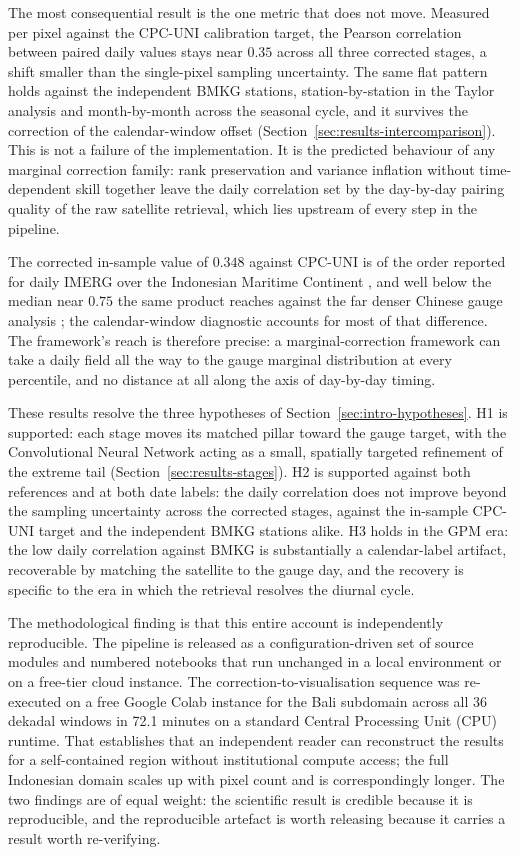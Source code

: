 The most consequential result is the one metric that
does not move. Measured per pixel against the CPC-UNI calibration
target, the Pearson correlation between paired daily values stays
near $0.35$ across all three corrected stages, a shift smaller
than the single-pixel sampling uncertainty. The same flat pattern
holds against the independent BMKG stations, station-by-station in
the Taylor analysis and month-by-month across the seasonal cycle,
and it survives the correction of the calendar-window offset
(Section~\ref{sec:results-intercomparison}). This is not a failure of the implementation. It is the
predicted behaviour of any marginal correction family: rank
preservation and variance inflation without time-dependent skill
together leave the daily correlation set by the day-by-day
pairing quality of the raw satellite retrieval, which lies
upstream of every step in the pipeline.

The corrected
in-sample value of $0.348$ against CPC-UNI is of the order reported
for daily IMERG over the Indonesian Maritime Continent
\citep{ref:ramadhan2022ts}, and well below the median near $0.75$
the same product reaches against the far denser Chinese gauge
analysis \citep{ref:tang2020}; the calendar-window diagnostic
accounts for most of that difference. The framework's reach is
therefore precise: a marginal-correction framework
can take a daily field all the way to the gauge marginal
distribution at every percentile, and no distance at all along
the axis of day-by-day timing.

These results resolve the three hypotheses of
Section~\ref{sec:intro-hypotheses}. H1 is supported: each stage
moves its matched pillar toward the gauge target, with the
Convolutional Neural Network acting as a small, spatially targeted
refinement of the extreme tail
(Section~\ref{sec:results-stages}). H2 is supported against both
references and at both date labels: the daily correlation does not
improve beyond the sampling uncertainty across the corrected
stages, against the in-sample CPC-UNI target and the independent
BMKG stations alike. H3 holds in the GPM era: the low daily
correlation against BMKG is substantially a calendar-label
artifact, recoverable by matching the satellite to the gauge day,
and the recovery is specific to the era in which the retrieval
resolves the diurnal cycle.

The methodological finding is that this entire account is
independently reproducible. The pipeline is released as a
configuration-driven set of source modules and numbered
notebooks that run unchanged in a local environment or on a
free-tier cloud instance. The correction-to-visualisation sequence
was re-executed
on a free Google Colab instance for the Bali subdomain across all
36 dekadal windows in 72.1 minutes on a standard Central
Processing Unit (CPU) runtime. That establishes that an independent
reader can reconstruct the results for a self-contained region
without institutional compute access; the full Indonesian domain
scales up with pixel count and is correspondingly longer. The two findings are of equal
weight: the scientific result is credible because it is
reproducible, and the reproducible artefact is worth releasing
because it carries a result worth re-verifying.


